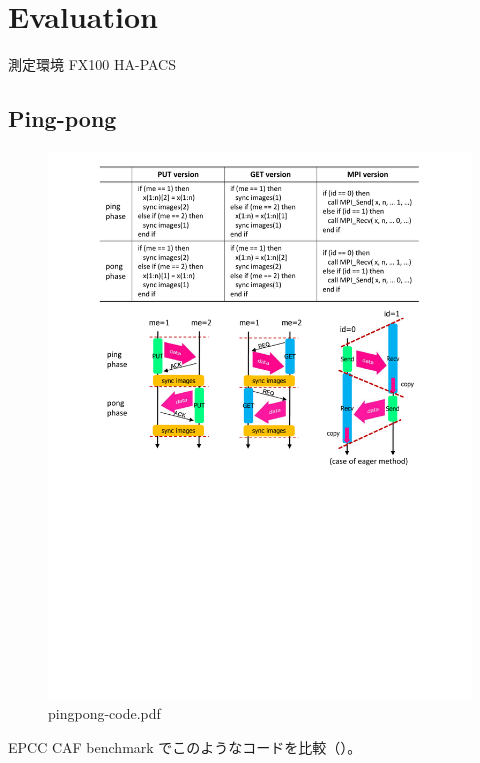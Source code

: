 \section{Evaluation}\label{sec:eval}

測定環境
FX100
HA-PACS


\subsection{Ping-pong}

\begin{figure}
  \begin{center}
    \mbox{\includegraphics[trim=24mm 118mm 24mm 4mm, scale=0.7,clip]{figs/pingpong-code.pdf}}
    \caption{pingpong-code.pdf}\label{fig:pingpong-code}
  \end{center}
\end{figure}

EPCC CAF benchmark
でこのようなコードを比較（）。


